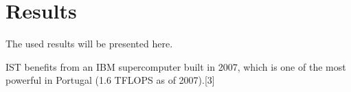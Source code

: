 \section{Results}
\label{sec:Results}
The used results will be presented here.

IST benefits from an IBM supercomputer built in 2007, which is one of the most powerful in Portugal (1.6 TFLOPS as of 2007).[3]


